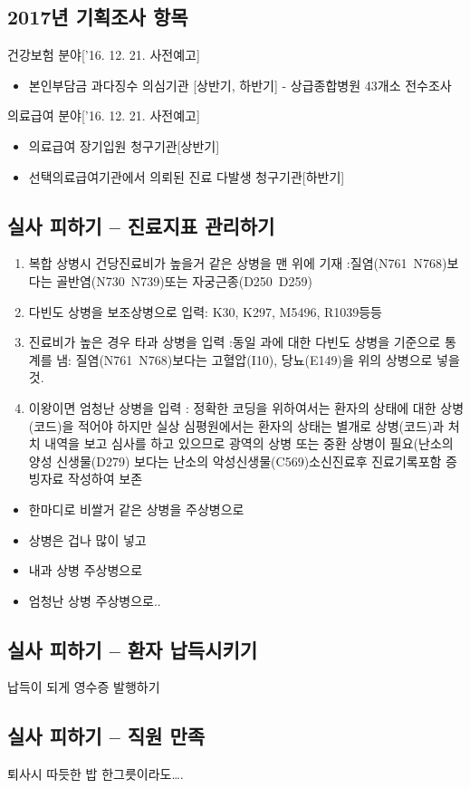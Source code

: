 \subsection{2017년 기획조사 항목}
건강보험 분야[’16. 12. 21. 사전예고]
\begin{itemize}\tightlist
\item 본인부담금 과다징수 의심기관 [상반기, 하반기] - 상급종합병원 43개소 전수조사
\end{itemize}
의료급여 분야[’16. 12. 21. 사전예고]
\begin{itemize}\tightlist
\item 의료급여 장기입원 청구기관[상반기]
\item 선택의료급여기관에서 의뢰된 진료 다발생 청구기관[하반기]
\end{itemize}

\subsection{실사 피하기 – 진료지표 관리하기}
\begin{enumerate}[해결책1.]\tightlist
\item 복합 상병시 건당진료비가 높을거 같은 상병을 맨 위에 기재
:질염(N761~N768)보다는 골반염(N730~N739)또는 자궁근종(D250~D259) 
\item 다빈도 상병을 보조상병으로 입력: K30, K297, M5496, R1039등등
\item  진료비가 높은 경우 타과 상병을 입력 
 :동일 과에 대한 다빈도 상병을 기준으로 통계를 냄: 질염(N761~N768)보다는 고혈압(I10), 당뇨(E149)을 위의 상병으로 넣을것.
\item 이왕이면 엄청난 상병을 입력
: 정확한 코딩을 위하여서는 환자의 상태에 대한 상병(코드)을 적어야 하지만 실상 
	심평원에서는 환자의 상태는 별개로 상병(코드)과  처치 내역을 보고 심사를 
	하고 있으므로 광역의  상병 또는 중환 상병이 필요(난소의 양성 신생물(D279)
	보다는 난소의 악성신생물(C569)소신진료후 진료기록포함 증빙자료 작성하여
	보존
\end{enumerate}
\begin{commentbox}{}
\begin{itemize}\tightlist 
\item 한마디로 비쌀거 같은 상병을 주상병으로 
\item 상병은 겁나 많이 넣고 
\item 내과 상병  주상병으로 
\item 엄청난 상병 주상병으로..
\end{itemize}
\end{commentbox}

\subsection{실사 피하기 – 환자 납득시키기}
납득이 되게 영수증 발행하기
\subsection{실사 피하기 – 직원 만족}
퇴사시 따듯한 밥 한그릇이라도….
